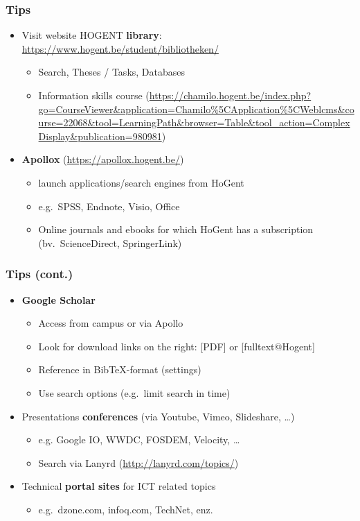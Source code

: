 \documentclass[aspectratio=169]{beamer}
\begin{document}
\begin{frame}
  \frametitle{Tips}
  
  \begin{itemize}
    \item<+-> Visit website HOGENT \textbf{library}: \url{https://www.hogent.be/student/bibliotheken/}
    \begin{itemize}
      \item Search, Theses / Tasks, Databases
      \item Information skills course (\url{https://chamilo.hogent.be/index.php?go=CourseViewer\&application=Chamilo\%5CApplication\%5CWeblcms\&course=22068\&tool=LearningPath\&browser=Table\&tool_action=ComplexDisplay\&publication=980981})
    \end{itemize}
    \item<+-> \textbf{Apollox} (\url{https://apollox.hogent.be/})
    \begin{itemize}
      \item launch applications/search engines from HoGent
      \item e.g.~SPSS, Endnote, Visio, Office
      \item Online journals and ebooks for which HoGent has a subscription (bv.~ScienceDirect, SpringerLink)
    \end{itemize}
  \end{itemize}
\end{frame}

\begin{frame}
  \frametitle{Tips (cont.)}
  
  \begin{itemize}
    \item<+-> \textbf{Google Scholar}
      \begin{itemize}
        \item Access from campus or via Apollo
        \item Look for download links on the right: [PDF] or [fulltext@Hogent]
        \item Reference in Bib{\TeX}-format (settings)
        \item Use search options (e.g.~limit search in time)
      \end{itemize}
    \item Presentations \textbf{conferences} (via Youtube, Vimeo, Slideshare, \dots)
    \begin{itemize}
      \item e.g. Google IO, WWDC, FOSDEM, Velocity, \dots
      \item Search via Lanyrd (\url{http://lanyrd.com/topics/})
    \end{itemize}
    \item<+-> Technical \textbf {portal sites} for ICT related topics
    \begin{itemize}
      \item e.g.~dzone.com, infoq.com, TechNet, enz.
    \end{itemize}
  \end{itemize}
\end{frame}
\end{document}
